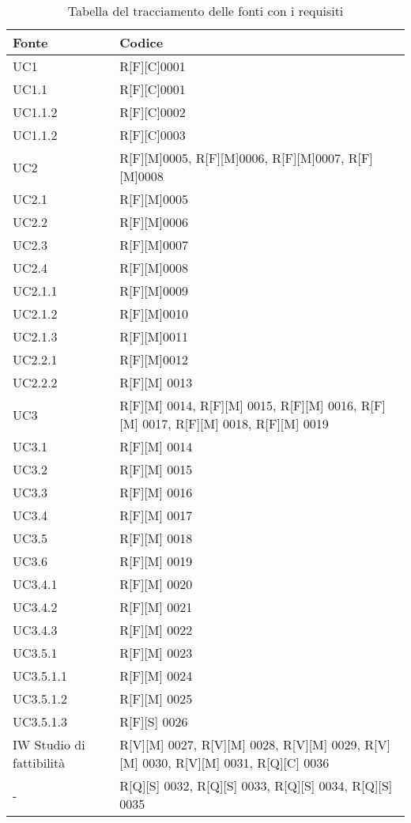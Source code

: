 \begin{center}
    \begin{longtable}{|p{3cm}|p{3cm}|}%
    \caption{Tabella del tracciamento delle fonti con i requisiti}
    \label{tab:fonte-req}
    \endfirsthead
    \endhead
    \hline
    \textbf{Fonte}  & \textbf{Codice}\\
    \hline
    UC1    & R[F][C]0001  \\
    \hline
    UC1.1   & R[F][C]0001  \\
    \hline
    UC1.1.2    & R[F][C]0002  \\
    \hline
    UC1.1.2    & R[F][C]0003  \\
    \hline
    UC2   & R[F][M]0005, R[F][M]0006, R[F][M]0007, R[F][M]0008 \\
    \hline
    UC2.1    & R[F][M]0005  \\
    \hline
    UC2.2    & R[F][M]0006  \\
    \hline
    UC2.3    & R[F][M]0007  \\
    \hline
    UC2.4 & R[F][M]0008 \\
    \hline
    UC2.1.1 & R[F][M]0009 \\
    \hline
    UC2.1.2 & R[F][M]0010 \\
    \hline
    UC2.1.3 & R[F][M]0011 \\
    \hline
    UC2.2.1 & R[F][M]0012 \\
    \hline
    UC2.2.2 & R[F][M] 0013 \\
    \hline
    UC3 & R[F][M] 0014, R[F][M] 0015, R[F][M] 0016, R[F][M] 0017, R[F][M] 0018, R[F][M] 0019\\
    \hline
    UC3.1 & R[F][M] 0014 \\
    \hline
    UC3.2 & R[F][M] 0015 \\
    \hline
    UC3.3 & R[F][M] 0016 \\
    \hline
    UC3.4 & R[F][M] 0017 \\
    \hline
    UC3.5 & R[F][M] 0018 \\
    \hline
    UC3.6 & R[F][M] 0019 \\
    \hline
    UC3.4.1 & R[F][M] 0020 \\
    \hline
    UC3.4.2 & R[F][M] 0021 \\
    \hline
    UC3.4.3 & R[F][M] 0022 \\
    \hline
    UC3.5.1 & R[F][M] 0023 \\
    \hline
    UC3.5.1.1 & R[F][M] 0024 \\
    \hline
    UC3.5.1.2 & R[F][M] 0025 \\
    \hline
    UC3.5.1.3 & R[F][S] 0026 \\
    \hline
    IW Studio di fattibilità & R[V][M] 0027, R[V][M] 0028, R[V][M] 0029, R[V][M] 0030, R[V][M] 0031, R[Q][C] 0036 \\
    \hline
    - & R[Q][S] 0032, R[Q][S] 0033, R[Q][S] 0034, R[Q][S] 0035 \\
    \hline
    \end{longtable}
    \end{center}%

